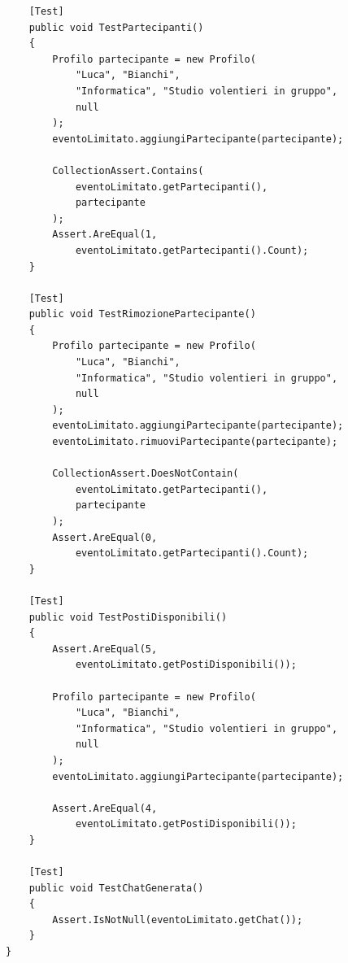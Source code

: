 \documentclass[12pt,a4paper]{report}
\begin{document}
\begin{lstlisting}
    [Test]
    public void TestPartecipanti()
    {
        Profilo partecipante = new Profilo(
            "Luca", "Bianchi",
            "Informatica", "Studio volentieri in gruppo",
            null
        );
        eventoLimitato.aggiungiPartecipante(partecipante);

        CollectionAssert.Contains(
            eventoLimitato.getPartecipanti(),
            partecipante
        );
        Assert.AreEqual(1,
            eventoLimitato.getPartecipanti().Count);
    }

    [Test]
    public void TestRimozionePartecipante()
    {
        Profilo partecipante = new Profilo(
            "Luca", "Bianchi",
            "Informatica", "Studio volentieri in gruppo",
            null
        );
        eventoLimitato.aggiungiPartecipante(partecipante);
        eventoLimitato.rimuoviPartecipante(partecipante);

        CollectionAssert.DoesNotContain(
            eventoLimitato.getPartecipanti(),
            partecipante
        );
        Assert.AreEqual(0,
            eventoLimitato.getPartecipanti().Count);
    }

    [Test]
    public void TestPostiDisponibili()
    {
        Assert.AreEqual(5,
            eventoLimitato.getPostiDisponibili());

        Profilo partecipante = new Profilo(
            "Luca", "Bianchi",
            "Informatica", "Studio volentieri in gruppo",
            null
        );
        eventoLimitato.aggiungiPartecipante(partecipante);

        Assert.AreEqual(4,
            eventoLimitato.getPostiDisponibili());
    }

    [Test]
    public void TestChatGenerata()
    {
        Assert.IsNotNull(eventoLimitato.getChat());
    }
}
\end{lstlisting}
\end{document}
